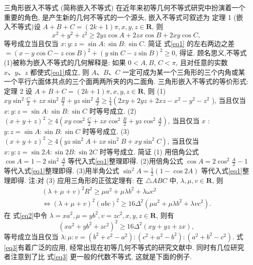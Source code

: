 
三角形嵌入不等式 (简称嵌入不等式) 在近年来初等几何不等式研究中扮演着一个重要的角色, 是产生新的几何不等式的一个源头, 嵌入不等式可叙述为
定理 1 (嵌入不等式)设 $A+B+C=(2 k+1) \pi, x, y, z \in \mathbf{R}$, 则
$$
x^2+y^2+z^2 \geqslant 2 y z \cos A+2 z x \cos B+2 x y \cos C, \label{eq1}
$$
等号成立当且仅当 $x: y: z=\sin A: \sin B: \sin C$.
简证 式\ref{eq1} 的左右两边之差 $=(x-y \cos C-z \cos B)^2+(y \sin C- z \sin B)^2 \geqslant 0$, 得证.
顾名思义,不等式(1)被称为嵌入不等式的几何解释是: 如果 $0<A, B$, $C<\pi$, 且对任意的实数 $x 、 y 、 z$ 都使式\ref{eq1}成立, 则 $A 、 B 、 C$ 一定可成为某一个三角形的三个内角或某一个平行六面体共点的三个面两两所夹的内二面角.
三角形嵌入不等式的等价形式:
定理 2 设 $A+B+C=(2 k+1) \pi, x, y, z \in \mathbf{R}$, 则
(1) $x y \sin ^2 \frac{C}{2}+z x \sin ^2 \frac{B}{2}+y z \sin ^2 \frac{A}{2} \geqslant \frac{1}{4}\left(2 x y+2 y z+2 x z-x^2-y^2-\right. z^2$ ), 当且仅当 $x: y: z=\sin A: \sin B: \sin C$ 时等号成立.
(2) $(x+y+z)^2 \geqslant 4\left(x y \cos ^2 \frac{C}{2}+z x \cos ^2 \frac{B}{2}+y z \cos ^2 \frac{A}{2}\right)$, 当且仅当 $x$ : $y: z=\sin A: \sin B: \sin C$ 时等号成立.
(3) $(x+y+z)^2 \geqslant 4\left(y z \sin ^2 A+z x \sin ^2 B+x y \sin ^2 C\right)$, 当且仅当 $x: y: z= \sin 2 A: \sin 2 B: \sin 2 C$ 时等号成立.
简证 (1) 用倍角公式 $\cos A=1-2 \sin ^2 \frac{A}{2}$ 等代入式\ref{eq1}整理即得.
(2)用倍角公式 $\cos A=2 \cos ^2 \frac{A}{2}-1$ 等代入式\ref{eq1}整理即得.
(3)用半角公式 $\sin ^2 A=\frac{1}{2}(1-\cos 2 A)$ 等代入式\ref{eq1}整理即得.
注:对 (3) 应用三角形的正弦定理有: 在 $\triangle A B C$ 中, $\lambda, \mu, v \in \mathbf{R}$, 则
$$
\begin{gathered}
(\lambda+\mu+v)^2 R^2 \geqslant \mu a^2+\mu \lambda b^2+\lambda \omega c^2 \\
\Leftrightarrow(\lambda+\mu+v)^2(a b c)^2 \geqslant 16 \Delta^2\left(\mu a^2+\mu \lambda b^2+\lambda v c^2\right) . \label{eq2}
\end{gathered}
$$
在 式\ref{eq2}中令 $\lambda=x a^2, \mu=y b^2, v=z c^2, x, y, z \in \mathbf{R}$, 则有
$$
\left(x a^2+y b^2+z c^2\right)^2 \geqslant 16 \Delta^2(x y+y z+z x), \label{eq3}
$$
等号成立当且仅当 $\lambda: \mu: v=\left(b^2+c^2-a^2\right):\left(c^2+a^2-b^2\right):\left(a^2+b^2-c^2\right)$.
式\ref{eq3}有着广泛的应用, 经常出现在初等几何不等式的研究文献中.
同时有几位研究者注意到了比 式\ref{eq3} 更一般的代数不等式, 这就是下面的例子.



